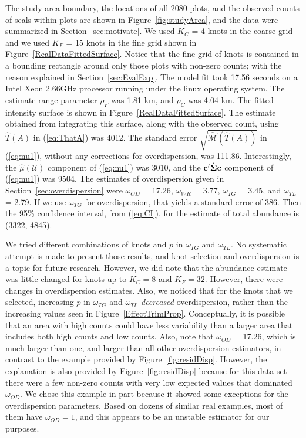 \documentclass[12pt, titlepage]{article}\usepackage[]{graphicx}\usepackage[]{color}
\def\bc{\mathbf{c}}
\def\cU{\mathcal{U}}
\def\cM{\mathcal{M}}
\def\bSigma{\mbox{\boldmath $\Sigma$}}
\begin{document}
The study area boundary, the locations of all 2080 plots, and the observed counts of seals within plots are shown in Figure~\ref{fig:studyArea}, and the data were summarized in Section~\ref{sec:motivate}.  We used $K_C$ = 4 knots in the coarse grid and we used $K_F$ = 15 knots in the fine grid shown in Figure~\ref{RealDataFittedSurface}. Notice that the fine grid of knots is contained in a bounding rectangle around only those plots with non-zero counts; with the reason explained in Section~\ref{sec:EvalExp}. The model fit took 17.56 seconds on a Intel Xeon 2.66GHz processor running under the linux operating system. The estimate range parameter $\rho_F$ was 1.81 km, and $\rho_C$ was 4.04 km. The fitted intensity surface is shown in Figure~\ref{RealDataFittedSurface}. The estimate obtained from integrating this surface, along with the observed count, using $\widehat{T}(A)$ in (\ref{eq:ThatA}) was 4012.  The standard error $\sqrt{\hat{\cM}(\hat{T}(A))}$ in (\ref{eq:nu1}), without any corrections for overdispersion, was 111.86.  Interestingly, the $\hat{\mu}(\cU)$ component of (\ref{eq:nu1}) was 3010, and the $\bc^\prime\hat{\bSigma}\bc$ component of (\ref{eq:nu1}) was 9504.  The estimates of overdispersion given in Section~\ref{sec:overdispersion} were $\omega_{OD}$ = 17.26, $\omega_{WR}$ = 3.77, $\omega_{TG}$ = 3.45, and $\omega_{TL}$ = 2.79. If we use $\omega_{TG}$ for overdispersion, that yields a standard error of 386.  Then the 95\% confidence interval, from (\ref{eq:CI}), for the estimate of total abundance is (3322, 4845).

We tried different combinations of knots and $p$ in $\omega_{TG}$ and $\omega_{TL}$.  No systematic attempt is made to present those results, and knot selection and overdispersion is a topic for future research.  However, we did note that the abundance estimate was little changed for knots up to $K_C = 8$ and $K_F = 32$.  However, there were changes in overdispersion estimates. Also, we noticed that for the knots that we selected, increasing $p$ in $\omega_{TG}$ and $\omega_{TL}$ \emph{decreased} overdispersion, rather than the increasing values seen in Figure~\ref{EffectTrimProp}. Conceptually, it is possible that an area with high counts could have less variability than a larger area that includes both high counts and low counts.  Also, note that $\omega_{OD}$ = 17.26, which is much larger than one, and larger than all other overdispersion estimators, in contrast to the example provided by Figure~\ref{fig:residDisp}. However, the explanation is also provided by Figure~\ref{fig:residDisp} because for this data set there were a few non-zero counts with very low expected values that dominated $\omega_{OD}$.  We chose this example in part because it showed some exceptions for the overdispersion parameters.  Based on dozens of similar real examples, most of them have $\omega_{OD} = 1$, and this appears to be an unstable estimator for our purposes.
\end{document}
